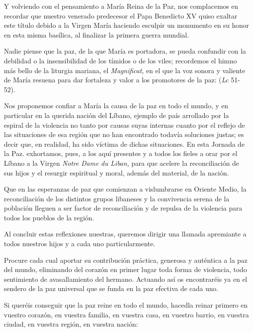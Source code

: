 Y volviendo con el pensamiento a María Reina de la Paz, nos complacemos en recordar que nuestro venerado predecesor el Papa Benedicto XV quiso exaltar este título debido a la Virgen María haciendo esculpir un monumento en su honor en esta misma basílica, al finalizar la primera guerra mundial.

Nadie piense que la paz, de la que María es portadora, se pueda confundir con la debilidad o la insensibilidad de los tímidos o de los viles; recordemos el himno más bello de la liturgia mariana, el \emph{Magnificat,} en el que la voz sonora y valiente de María resuena para dar fortaleza y valor a los promotores de la paz:  (\emph{Lc} 51-52).

Nos proponemos confiar a María la causa de la paz en todo el mundo, y en particular en la querida nación del Líbano, ejemplo de país arrollado por la espiral de la violencia no tanto por causas suyas internas cuanto por el reflejo de las situaciones de esa región que no han encontrado todavía soluciones justas; es decir que, en realidad, ha sido víctima de dichas situaciones. En esta Jornada de la Paz. exhortamos, pues, a los aquí presentes y a todos los fieles a orar por el Líbano a la Virgen \emph{Notre Dame du Liban,} para que acelere la reconciliación de sus hijos \emph{} y el resurgir espiritual y moral, además del material, de la nación.

Que en las esperanzas de paz que comienzan a vislumbrarse en Oriente Medio, la reconciliación de los distintos grupos libaneses y la convivencia serena de la población lleguen a ser factor de reconciliación y de repulsa de la violencia para todos los pueblos de la región.

Al concluir estas reflexiones nuestras, queremos dirigir una llamada apremiante a todos nuestros hijos y a cada uno particularmente.

Procure cada cual aportar su contribución práctica, generosa y auténtica a la paz del mundo, eliminando del corazón en primer lugar toda forma de violencia, todo sentimiento de avasallamiento del hermano. Actuando así os encontraréis ya en el sendero de la paz universal que se funda en la paz efectiva de cada uno.

Si queréis conseguir que la paz reine en todo el mundo, hacedla reinar primero en vuestro corazón, en vuestra familia, en vuestra casa, en vuestro barrio, en vuestra ciudad, en vuestra región, en vuestra nación:

